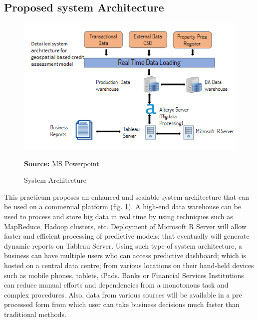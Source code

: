 \subsection{Proposed system Architecture}
\begin{center}
\begin{figure}[!htb]
\includegraphics[width=\textwidth]{future.png}
\centering
\caption{System Architecture}{\textbf{Source:} MS Powerpoint}
\label{fig:future}
\end{figure}
\end{center}

This practicum proposes an enhanced and scalable system architecture that can be used on a commercial platform (fig. \ref{fig:future}). A high-end data warehouse can be used to process and store big data in real time by using techniques such as MapReduce, Hadoop clusters, etc. Deployment of Microsoft R Server will allow faster and efficient processing of predictive models; that eventually will generate dynamic reports on Tableau Server. Using such type of system architecture, a business can have multiple users who can access predictive dashboard; which is hosted on a central data centre; from various locations on their hand-held devices such as mobile phones, tablets, iPads. Banks or Financial Services Institutions can reduce manual efforts and dependencies from a monotonous task and complex procedures. Also, data from various sources will be available in a pre processed form from which user can take business decisions much faster than traditional methods. 

